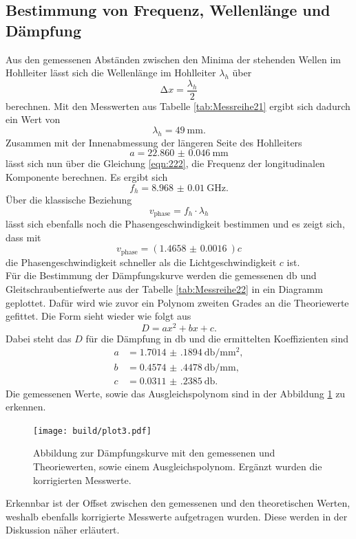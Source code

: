 \subsection{Bestimmung von Frequenz, Wellenlänge und Dämpfung}

Aus den gemessenen Abständen zwischen den Minima der stehenden Wellen im Hohlleiter lässt sich die Wellenlänge im Hohlleiter $\lambda_h$ über
\begin{equation*}
\increment x = \frac{\lambda_h}{2}
\end{equation*}
berechnen. Mit den Messwerten aus Tabelle \ref{tab:Messreihe21} ergibt sich dadurch ein Wert von
\begin{equation*}
\lambda_h = \SI{49}{\milli\meter}.
\end{equation*}
Zusammen mit der Innenabmessung der längeren Seite des Hohlleiters
\begin{equation*}
a = \SI{22.860(46)}{\milli\meter}
\end{equation*}
lässt sich nun über die Gleichung \ref{eqn:222}, die Frequenz der longitudinalen Komponente berechnen.
Es ergibt sich 
\begin{equation*}
f_h = \SI{8.968(10)}{\giga\hertz}.
\end{equation*}
Über die klassische Beziehung 
\begin{equation*}
v_{\text{phase}} = f_h \cdot \lambda_h
\end{equation*}
lässt sich ebenfalls noch die Phasengeschwindigkeit bestimmen und es zeigt sich, dass mit 
\begin{equation*}
v_{\text{phase}} = \left(\SI{1.4658(16)}{}\right) c
\end{equation*}
die Phasengeschwindigkeit schneller als die Lichtgeschwindigkeit $c$ ist. 
\\
\newline
Für die Bestimmung der Dämpfungskurve werden die gemessenen $\si{\decibel}$ und Gleitschraubentiefwerte aus der Tabelle \ref{tab:Messreihe22} in ein Diagramm geplottet.
Dafür wird wie zuvor ein Polynom zweiten Grades an die Theoriewerte gefittet. Die Form sieht wieder wie folgt aus
\begin{equation*}
D = ax^2 + bx + c.
\end{equation*}
Dabei steht das $D$ für die Dämpfung in $\si{\decibel}$ und die ermittelten Koeffizienten sind
\begin{align*}
a &= \SI{1.7014(1894)}{\decibel\per\milli\meter\squared}, \\
b &= \SI{0.4574(4478)}{\decibel\per\milli\meter}, \\
c &= \SI{0.0311(2385)}{\decibel}.
\end{align*}
Die gemessenen Werte, sowie das Ausgleichspolynom sind in der Abbildung \ref{111} zu erkennen.
\begin{figure}
    \centering
    \texttt{[image: build/plot3.pdf]}
    \caption{Abbildung zur Dämpfungskurve mit den gemessenen und Theoriewerten, sowie einem Ausgleichspolynom. Ergänzt wurden die korrigierten Messwerte.} 
    \label{111}
\end{figure}
Erkennbar ist der Offset zwischen den gemessenen und den theoretischen Werten, weshalb ebenfalls korrigierte Messwerte aufgetragen wurden. Diese werden in der Diskussion näher
erläutert.


